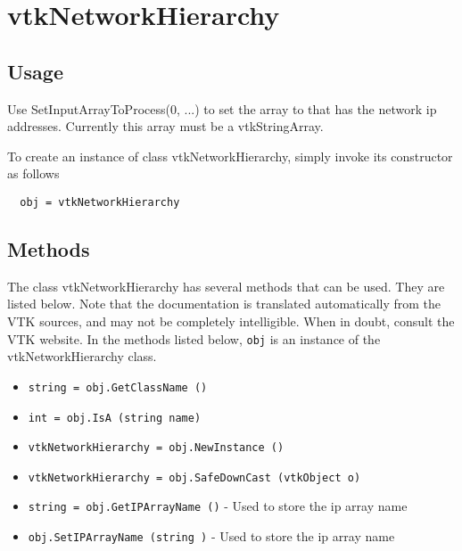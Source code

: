 \section{vtkNetworkHierarchy}

\subsection{Usage}

 Use SetInputArrayToProcess(0, ...) to set the array to that has
 the network ip addresses.
 Currently this array must be a vtkStringArray.

To create an instance of class vtkNetworkHierarchy, simply
invoke its constructor as follows
\begin{verbatim}
  obj = vtkNetworkHierarchy
\end{verbatim}
\subsection{Methods}

The class vtkNetworkHierarchy has several methods that can be used.
  They are listed below.
Note that the documentation is translated automatically from the VTK sources,
and may not be completely intelligible.  When in doubt, consult the VTK website.
In the methods listed below, \verb|obj| is an instance of the vtkNetworkHierarchy class.
\begin{itemize}
\item  \verb|string = obj.GetClassName ()|

\item  \verb|int = obj.IsA (string name)|

\item  \verb|vtkNetworkHierarchy = obj.NewInstance ()|

\item  \verb|vtkNetworkHierarchy = obj.SafeDownCast (vtkObject o)|

\item  \verb|string = obj.GetIPArrayName ()| -  Used to store the ip array name

\item  \verb|obj.SetIPArrayName (string )| -  Used to store the ip array name

\end{itemize}
